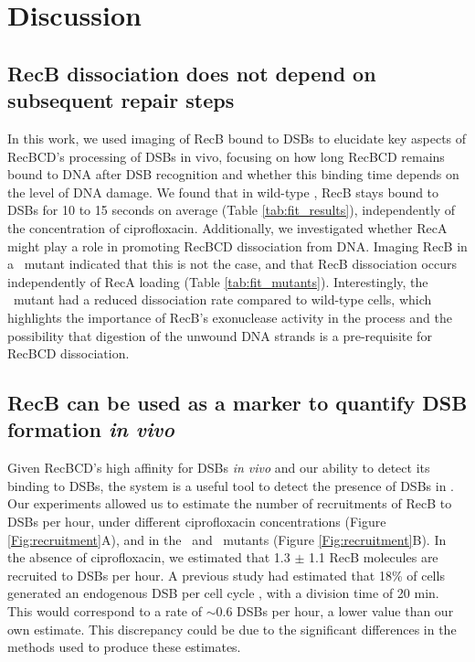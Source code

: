 \section*{Discussion}

\subsection*{RecB dissociation does not depend on subsequent repair steps}
In this work, we used imaging of RecB bound to DSBs to elucidate key aspects of RecBCD's processing of DSBs in vivo, focusing on how long RecBCD remains bound to DNA after DSB recognition and whether this binding time depends on the level of DNA damage. We found that in wild-type \ecoli, RecB stays bound to DSBs for 10 to 15 seconds on average (Table \ref{tab:fit_results}), independently of the concentration of ciprofloxacin. Additionally, we investigated whether RecA might play a role in promoting RecBCD dissociation from DNA. Imaging RecB in a \dreca\ mutant indicated that this is not the case, and that RecB dissociation occurs independently of RecA loading (Table \ref{tab:fit_mutants}). Interestingly, the \geneteneighty\ mutant had a reduced dissociation rate compared to wild-type cells, which highlights the importance of RecB's exonuclease activity in the process and the possibility that digestion of the unwound DNA strands is a pre-requisite for RecBCD dissociation.

\subsection*{RecB can be used as a marker to quantify DSB formation \emph{in vivo}}
Given RecBCD's high affinity for DSBs \emph{in vivo} and our ability to detect its binding to DSBs, the system is a useful tool to detect the presence of DSBs in \ecoli. Our experiments allowed us to estimate the number of recruitments of RecB to DSBs per hour, under different ciprofloxacin concentrations (Figure \ref{Fig:recruitment}A), and in the \dreca\ and \geneteneighty\ mutants (Figure \ref{Fig:recruitment}B). In the absence of ciprofloxacin, we estimated that 1.3 $\pm$ 1.1 RecB molecules are recruited to DSBs per hour. A previous study had estimated that 18\% of cells generated an endogenous DSB per cell cycle \cite{Sinha2018}, with a division time of 20 min. This would correspond to a rate of $\sim$0.6 DSBs per hour, a lower value than our own estimate. This discrepancy could be due to the significant differences in the methods used to produce these estimates.

